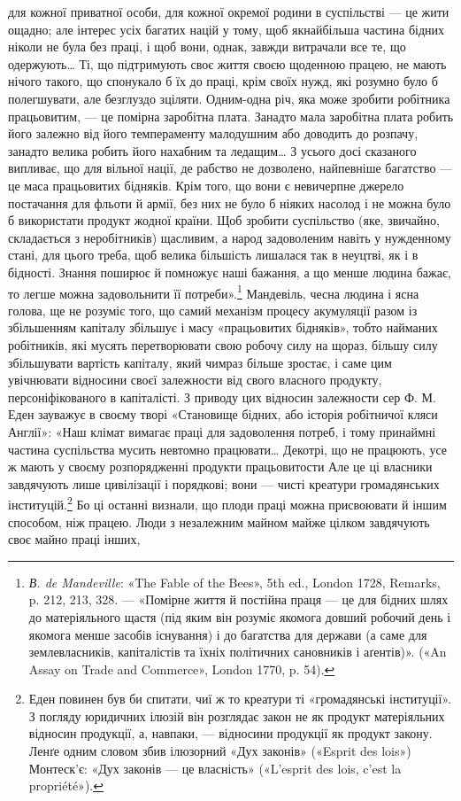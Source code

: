 \parcont{}  %
для кожної приватної особи, для кожної окремої родини в суспільстві
— це жити ощадно; але інтерес усіх багатих націй у
тому, щоб якнайбільша частина бідних ніколи не була без праці,
і щоб вони, однак, завжди витрачали все те, що одержують\dots{}
Ті, що підтримують своє життя своєю щоденною працею, не
мають нічого такого, що спонукало б їх до праці, крім своїх
нужд, які розумно було б полегшувати, але безглуздо зціляти.
Одним-одна річ, яка може зробити робітника працьовитим, —
це помірна заробітна плата. Занадто мала заробітна плата робить
його залежно від його темпераменту малодушним або доводить
до розпачу, занадто велика робить його нахабним та ледащим\dots{}
З усього досі сказаного випливає, що для вільної нації, де рабство
не дозволено, найпевніше багатство — це маса працьовитих бідняків.
Крім того, що вони є невичерпне джерело постачання для
фльоти й армії, без них не було б ніяких насолод і не можна
було б використати продукт жодної країни. Щоб зробити суспільство
(яке, звичайно, складається з неробітників) щасливим, а
народ задоволеним навіть у нужденному стані, для цього треба,
щоб велика більшість лишалася так в неуцтві, як і в бідності.
Знання поширює й помножує наші бажання, а що менше людина
бажає, то легше можна задовольнити її потреби».\footnote{
\emph{В. de Mandeville}: «The Fable of the Bees», 5th ed., London 1728,
Remarks, p. 212, 213, 328. — «Помірне життя й постійна праця — це для
бідних шлях до матеріяльного щастя (під яким він розуміє якомога довший
робочий день і якомога менше засобів існування) і до багатства для
держави (а саме для землевласників, капіталістів та їхніх політичних
сановників і аґентів)». («An Assay on Trade and Commerce», London
1770, p. 54).
} Мандевіль,
чесна людина і ясна голова, ще не розуміє того, що самий механізм
процесу акумуляції разом із збільшенням капіталу збільшує
і масу «працьовитих бідняків», тобто найманих робітників,
які мусять перетворювати свою робочу силу на щораз, більшу
силу збільшувати вартість капіталу, який чимраз більше зростає,
і саме цим увічнювати відносини своєї залежности від
свого власного продукту, персоніфікованого в капіталісті. З приводу
цих відносин залежности сер Ф. М. Еден зауважує в своєму
творі «Становище бідних, або історія робітничої кляси Англії»:
«Наш клімат вимагає праці для задоволення потреб, і тому
принаймні частина суспільства мусить невтомно працювати\dots{}
Декотрі, що не працюють, усе ж мають у своєму розпорядженні
продукти працьовитости Але це ці власники завдячують лише
цивілізації і порядкові; вони — чисті креатури громадянських
інституцій.\footnote{
Еден повинен був би спитати, чиї ж то креатури ті «громадянські
інституції». З погляду юридичних ілюзій він розглядає закон не як
продукт матеріяльних відносин продукції, а, навпаки, — відносини продукції
як продукт закону. Ленґе одним словом збив ілюзорний «Дух
законів» («Esprit des lois») Монтеск’є: «Дух законів — це власність»
(«L’esprit des lois, c’est la propriété»).
} Бо ці останні визнали, що плоди праці можна
присвоювати й іншим способом, ніж працею. Люди з незалежним
майном майже цілком завдячують своє майно праці інших,
\parbreak{}  %
